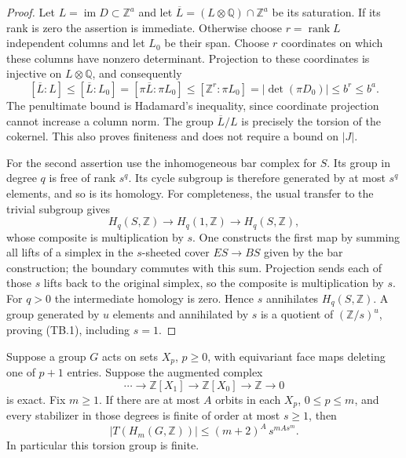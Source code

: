 \begin{proof}
Let $L=\operatorname{im}D\subset\mathbb Z^a$ and let
$\overline L=(L\otimes\mathbb Q)\cap\mathbb Z^a$ be its saturation.
If its rank is zero the assertion is immediate.  Otherwise choose
$r=\operatorname{rank}L$ independent columns and let $L_0$ be their
span.  Choose $r$ coordinates on which these columns have nonzero
determinant.  Projection to these coordinates is injective on
$L\otimes\mathbb Q$, and consequently
\[
 [\overline L:L]\le[\overline L:L_0]
  =[\pi\overline L:\pi L_0]
  \le[\mathbb Z^r:\pi L_0]
  =|\det(\pi D_0)|\le b^r\le b^a.
\]
The penultimate bound is Hadamard's inequality, since coordinate
projection cannot increase a column norm.  The group
$\overline L/L$ is precisely the torsion of the cokernel.  This
also proves finiteness and does not require a bound on $|J|$.

For the second assertion use the inhomogeneous bar complex for $S$.
Its group in degree $q$ is free of rank $s^q$.  Its cycle subgroup is
therefore generated by at most $s^q$ elements, and so is its homology.
For completeness, the usual transfer to the trivial subgroup gives
\[
 H_q(S,\mathbb Z)\longrightarrow H_q(1,\mathbb Z)
       \longrightarrow H_q(S,\mathbb Z),
\]
whose composite is multiplication by $s$.  One constructs the first
map by summing all lifts of a simplex in the $s$-sheeted cover
$ES\to BS$ given by the bar construction; the boundary commutes
with this sum.  Projection sends each of those $s$ lifts back to
the original simplex, so the composite is multiplication by $s$.
For $q>0$ the intermediate homology is zero.  Hence $s$ annihilates
$H_q(S,\mathbb Z)$.  A group generated by $u$ elements and annihilated
by $s$ is a quotient of $(\mathbb Z/s)^u$, proving (TB.1), including
$s=1$.
\end{proof}

\begin{proposition}
\label{prop:tb-equivariant-bound}
Suppose a group $G$ acts on sets $X_p$, $p\ge0$, with equivariant
face maps deleting one of $p+1$ entries.  Suppose the augmented
complex
\[
 \cdots\longrightarrow\mathbb Z[X_1]\longrightarrow
 \mathbb Z[X_0]\longrightarrow\mathbb Z\longrightarrow0
 \tag{TB.2}
\]
is exact.  Fix $m\ge1$.  If there are at most $A$ orbits in each
$X_p$, $0\le p\le m$, and every stabilizer in those degrees is
finite of order at most $s\ge1$, then
\[
 |T(H_m(G,\mathbb Z))|
       \le (m+2)^A\,s^{m A s^m}.
 \tag{TB.3}
\]
In particular this torsion group is finite.
\end{proposition}

